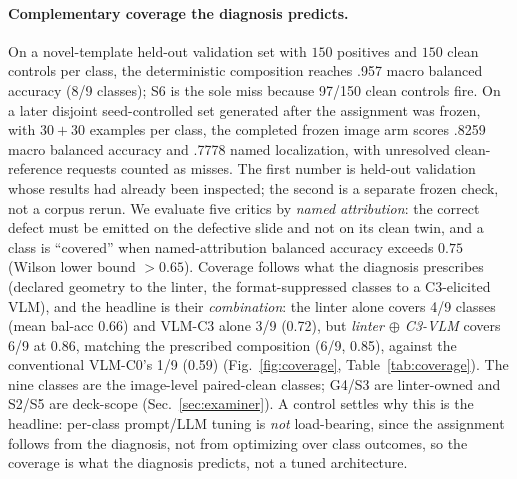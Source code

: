 \documentclass[10pt]{article}
\newcommand{\g}[1]{\textsf{#1}}        %
\begin{document}
\paragraph{Complementary coverage the diagnosis predicts.}
On a novel-template held-out validation set with $150$ positives and $150$ clean controls per class, the
deterministic composition reaches .957 macro balanced accuracy (8/9 classes); \g{S6} is the sole miss because
97/150 clean controls fire. On a later disjoint seed-controlled set generated after the assignment was frozen,
with $30+30$ examples per class, the completed frozen image arm scores .8259 macro balanced accuracy and .7778
named localization, with unresolved clean-reference requests counted as misses. The first number is held-out
validation whose results had already been inspected; the second is a separate frozen check, not a corpus rerun.
We evaluate five critics by \emph{named attribution}: the correct defect must be emitted on the defective slide
and not on its clean twin, and a class is ``covered'' when named-attribution balanced accuracy exceeds $0.75$
(Wilson lower bound $>0.65$). Coverage follows what the diagnosis prescribes (declared geometry to the
linter, the format-suppressed classes to a C3-elicited VLM), and the headline is their \emph{combination}: the
linter alone covers 4/9 classes (mean bal-acc 0.66) and VLM-C3 alone 3/9 (0.72), but
\emph{linter $\oplus$ C3-VLM} covers 6/9 at 0.86, matching the prescribed composition
(6/9, 0.85), against the conventional VLM-C0's 1/9 (0.59) (Fig.~\ref{fig:coverage},
Table~\ref{tab:coverage}). The nine classes are the image-level paired-clean classes; \g{G4}/\g{S3} are
linter-owned and \g{S2}/\g{S5} are deck-scope (Sec.~\ref{sec:examiner}). A control settles why this is the
headline: per-class prompt/LLM tuning is \emph{not} load-bearing, since the assignment follows from the
diagnosis, not from optimizing over class outcomes, so the coverage is what the diagnosis predicts, not a tuned
architecture.
\end{document}
